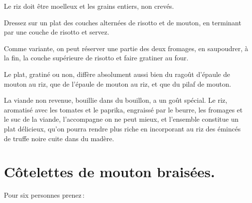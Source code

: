 Le riz doit être moelleux et les grains entiers, non crevés.

Dressez sur un plat des couches alternées de risotto et de mouton, en terminant
par une couche de risotto et servez.

\sk

Comme variante, on peut réserver une partie des deux fromages, en saupoudrer,
à la fin, la couche supérieure de risotto et faire gratiner au four.

\medskip

Le plat, gratiné ou non, diffère absolument aussi bien du ragoût d'épaule de
mouton au riz, que de l'épaule de mouton au riz, et que du pilaf de mouton.

La viande non revenue, bouillie dans du bouillon, a un goût spécial. Le riz,
aromatisé avec les tomates et le paprika, engraissé par le beurre, les fromages
et le suc de la viande, l'accompagne on ne peut mieux, et l'ensemble constitue
un plat délicieux, qu'on pourra rendre plus riche en incorporant au riz des
émincés de truffe noire cuite dans du madère.

\section*{\centering Côtelettes de mouton braisées.}
{}

Pour six personnes prenez :

\medskip


